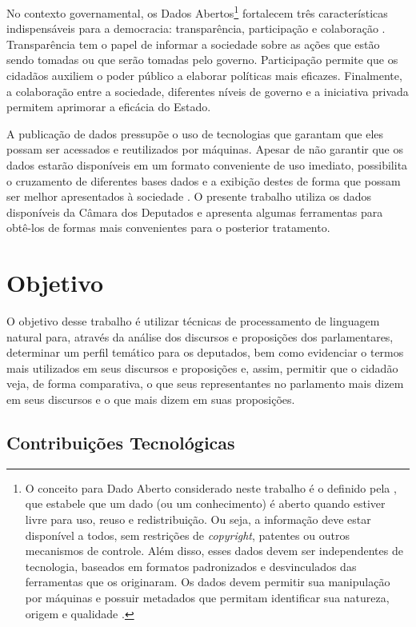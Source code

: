 No contexto governamental, os Dados Abertos\footnote{O conceito para Dado Aberto considerado neste trabalho é o definido pela , que estabele que um dado (ou um conhecimento) é aberto quando estiver livre para uso, reuso e redistribuição. Ou seja, a informação deve estar disponível a todos, sem restrições de \textit{copyright}, patentes ou outros mecanismos de controle. Além disso, esses dados devem ser independentes de tecnologia, baseados em formatos padronizados e desvinculados das ferramentas que os originaram. Os dados devem permitir sua manipulação por máquinas e possuir metadados que permitam identificar sua natureza, origem e qualidade \cite{diniz2010}.} fortalecem três características indispensáveis para a democracia: transparência, participação e colaboração \cite{consegi2011}. Transparência tem o papel de informar a sociedade sobre as ações que estão sendo tomadas ou que serão tomadas pelo governo. Participação permite que os cidadãos auxiliem o poder público a elaborar políticas mais eficazes. Finalmente, a colaboração entre a sociedade, diferentes níveis de governo e a iniciativa privada permitem aprimorar a eficácia do Estado.

A publicação de dados pressupõe o uso de tecnologias que garantam que eles possam ser acessados e reutilizados por máquinas. Apesar de não garantir que os dados estarão disponíveis em um formato conveniente de uso imediato, possibilita o cruzamento de diferentes bases dados e a exibição destes de forma que possam ser melhor apresentados à sociedade \cite{diniz2010}. O presente trabalho utiliza os dados disponíveis da Câmara dos Deputados e apresenta algumas ferramentas para obtê-los de formas mais convenientes para o posterior tratamento.

\section{Objetivo}
\label{sec:objetivo}

O objetivo desse trabalho é utilizar técnicas de processamento de linguagem natural para, através da análise dos discursos e proposições dos parlamentares, determinar um perfil temático para os deputados, bem como evidenciar o termos mais utilizados em seus discursos e proposições e, assim, permitir que o cidadão veja, de forma comparativa, o que seus representantes no parlamento mais dizem em seus discursos e o que mais dizem em suas proposições.

\subsection{Contribuições Tecnológicas}
\label{sub:contribuicoes_tecnologicas}

